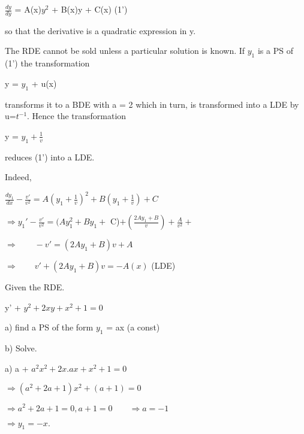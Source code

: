 \documentclass[11pts]{amsbook}
\begin{document}
\begin{center}
$\frac{dy}{dy}$ = A(x)$y^2$ + B(x)y + C(x) \qquad \qquad \qquad \qquad (1')
\end{center}
so that the derivative is a quadratic expression in y.

\qquad The RDE cannot be sold unless a particular solution is known. If $y_1$ is a PS of (1') the transformation
\begin{center}
y = $y_1$ + u(x)
\end{center}
transforms it to a BDE with a = 2 which in turn, is transformed into a LDE by u=$t^{-1}$. Hence the transformation
\begin{center}
y = $y_1 + \frac{1}{v}$
\end{center}
reduces (1') into a LDE.

\qquad Indeed, 

\qquad \qquad \qquad $\frac{dy_1}{dx} - \frac{v'}{v^2} = {A(y_1+\frac{1}{v})}^2+B(y_1+\frac{1}{v})+C$

\qquad $\Longrightarrow y_1' - \frac{v'}{v^2} = (Ay_1^2 + By_1  + $ C)$ + (\frac{2Ay_1 + B}{v}) + \frac{A}{v^2} +$

\qquad $\Longrightarrow \qquad -v' = (2Ay_1 + B)v + A$

\qquad $\Longrightarrow \qquad v' + (2Ay_1 + B)v = -A(x)$ \qquad \qquad \qquad (LDE)

\begin{exmp}
Given the RDE.

\qquad \qquad y' + $y^2 + 2xy + x^2 + 1 = 0$

a) find a PS of the form $y_1$ = ax (a const)

b) Solve.
\begin{hSolution}
a) a + $a^2x^2 + 2x.ax + x^2 + 1 = 0$

\qquad $\Longrightarrow  (a^2 + 2a + 1)x^2 + (a+1) = 0$

\qquad $\Longrightarrow  a^2 + 2a + 1 = 0, a + 1 = 0 \qquad \Longrightarrow a = -1$

\qquad $\Longrightarrow  y_1 = -x.$
\end{hSolution}
\end{exmp}
\end{document}

